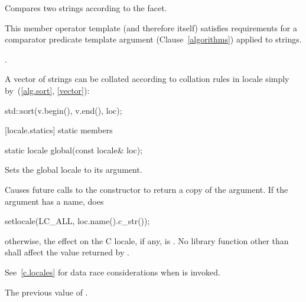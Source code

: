 \begin{itemdescr}
\pnum
\effects
Compares two strings according to the
facet.

\pnum
\remarks
This member operator template (and therefore
itself) satisfies requirements for a comparator predicate template argument
(Clause~\ref{algorithms}) applied to strings.

\pnum
\returns
{}.

\pnum
\begin{example}
A vector of strings
can be collated according to collation rules in locale
simply by~(\ref{alg.sort}, \ref{vector}):

\begin{codeblock}
std::sort(v.begin(), v.end(), loc);
\end{codeblock}
\end{example}
\end{itemdescr}

[locale.statics]{ static members}

%
\begin{itemdecl}
static locale global(const locale& loc);
\end{itemdecl}

\begin{itemdescr}
\pnum
Sets the global locale to its argument.

\pnum
\effects
Causes future calls to the constructor
to return a copy of the argument.
If the argument has a name, does

\begin{codeblock}
setlocale(LC_ALL, loc.name().c_str());
\end{codeblock}

otherwise, the effect on the C locale, if any, is .
No library function other than
shall affect the value returned by
.
\begin{note} See~\ref{c.locales} for data race considerations when
 is invoked. \end{note}

\pnum
\returns
The previous value of
.
\end{itemdescr}

